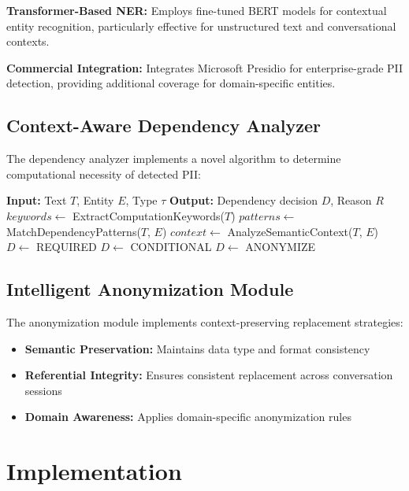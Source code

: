 \documentclass[conference]{IEEEtran}
\begin{document}
\textbf{Transformer-Based NER:} Employs fine-tuned BERT models for contextual entity recognition, particularly effective for unstructured text and conversational contexts.

\textbf{Commercial Integration:} Integrates Microsoft Presidio for enterprise-grade PII detection, providing additional coverage for domain-specific entities.

\subsection{Context-Aware Dependency Analyzer}

The dependency analyzer implements a novel algorithm to determine computational necessity of detected PII:

\begin{algorithmic}
\STATE \textbf{Input:} Text $T$, Entity $E$, Type $\tau$
\STATE \textbf{Output:} Dependency decision $D$, Reason $R$
\STATE $keywords \leftarrow$ ExtractComputationKeywords($T$)
\STATE $patterns \leftarrow$ MatchDependencyPatterns($T$, $E$)
\STATE $context \leftarrow$ AnalyzeSemanticContext($T$, $E$)
    \STATE $D \leftarrow$ REQUIRED
    \STATE $D \leftarrow$ CONDITIONAL
\ELSE
    \STATE $D \leftarrow$ ANONYMIZE
\ENDIF
\end{algorithmic}

\subsection{Intelligent Anonymization Module}

The anonymization module implements context-preserving replacement strategies:

\begin{itemize}
\item \textbf{Semantic Preservation:} Maintains data type and format consistency
\item \textbf{Referential Integrity:} Ensures consistent replacement across conversation sessions
\item \textbf{Domain Awareness:} Applies domain-specific anonymization rules
\end{itemize}

\section{Implementation}
\end{document}
